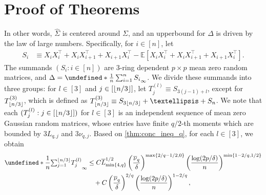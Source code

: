\documentclass[10pt,a4paper]{amsart}
\theoremstyle{plain}
\theoremstyle{remark}
\def\hat#1{\widehat{#1}}
\def\bar#1{\overline{#1}}
\newcommand{\tsum}{{\textstyle\sum}}
\let\norm\undefined %
\DeclarePairedDelimiter\norm{\lVert}{\rVert}
\DeclarePairedDelimiter\floor{\lfloor}{\rfloor}
\newcommand{\Exp}{\mathbb{E}}	%
\begin{document}
\appendix
\setcounter{equation}{0}
\renewcommand{\theequation}{\thesection.\arabic{equation}}
\section{Proof of Theorems} \label{sec:pf_thm}

\setcounter{equation}{11}
In other words, $\hat\Sigma$ is centered around $\Sigma$, and an upperbound for $\Delta$ is driven by the law of large numbers. Specifically, for $i \in [n]$, let 
\begin{equation*}
\begin{aligned}
    S_i 
    & \equiv  X_i X_i^\top + X_i X_{i+1}^\top + X_{i+1} X_i^\top
    - \Exp\left[
        X_i X_i^\top + X_i X_{i+1}^\top + X_{i+1} X_i^\top
    \right].
\end{aligned}
\end{equation*}
The summands $(S_i: i \in [n])$ are $3$-ring dependent $p \times p$ mean zero random matrices, and $\Delta = \norm*{\frac{1}{n} \sum_{i=1}^{n} S_i}_\infty$. We divide these summands into three groups: 
for $l \in [3]$ and $j \in [\floor{n/3}]$, let $T^{(l)}_j \equiv S_{3(j-1)+l}$, except for $T^{(3)}_{\floor{n/3}}$, which is defined as $T^{(3)}_{\floor{n/3}} \equiv S_{3\floor{n/3}} + \dots + S_n$. We note that each $(T^{(l)}_j: j \in [\floor{n/3}])$ for $l \in [3]$ is an independent sequence of mean zero Gaussian random matrices, whose entries have finite $q/2$-th moments which are bounded by $3 L_{q,j}$ and $3 \nu_{q,j}$. Based on \cref{thm:conc_ineq_q}, for each $l \in [3]$, we obtain
\begin{equation} \label{eq:conc_ineq_Sigma}
\begin{aligned}
    \norm*{\frac{1}{n} \tsum_{j=1}^{\floor{n/3}} T^{(l)}_j}_\infty 
    & \leq C \bar{L}_{\min\{4, q\}}^{1/2} \left(\frac{\bar{\nu}_{q}}{\delta} \right)^{\max\{2/q-1/2,0\}}
    \left(\frac{\log(2p/\delta)}{n}\right)^{\min\{1-2/q, 1/2\}} \\
    & \quad + C \left(\frac{\bar{\nu}_{q}}{\delta} \right)^{2/q} \left(\frac{\log(2p/\delta)}{n}\right)^{1-2/q},
\end{aligned}
\end{equation}
\end{document}
